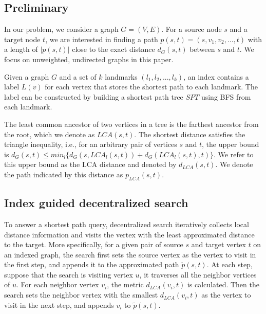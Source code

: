 \subsection{Preliminary}
In our problem, we consider a graph $G = (V,E)$. For a source node $s$ and a target node $t$, we are interested in finding a path $p(s,t)=(s,v_1,v_2,...,t)$ with a length of $|p(s,t)|$ close to the exact distance $d_G(s,t)$ between $s$ and $t$. We focus on unweighted, undirected graphs in this paper.

Given a graph $G$ and a set of $k$ landmarks $(l_1,l_2,...,l_k)$, an index contains a label $L(v)$ for each vertex that stores the shortest path to each landmark. The label can be constructed by building a shortest path tree $SPT$ using BFS from each landmark.

The least common ancestor of two vertices in a tree is the farthest ancestor from the root, which we denote as $LCA(s,t)$. The shortest distance satisfies the triangle inequality, i.e., for an arbitrary pair of vertices $s$ and $t$, the upper bound is $d_G(s,t) \leq min_{l}\{d_G(s,LCA_{l}(s,t)) + d_G(LCA_{l}(s,t),t)\}$.
We refer to this upper bound as the LCA distance and denoted by $d_{LCA}(s,t)$. We denote the path indicated by this distance as $p_{LCA}(s,t)$. 

\subsection{Index guided decentralized search}

To answer a shortest path query, decentralized search iteratively collects local distance information and visits the vertex with the least approximated distance to the target. More specifically, for a given pair of source $s$ and target vertex $t$ on an indexed graph, the search first sets the source vertex as the vertex to visit in the first step, and appends it to the approximated path $\tilde{p}(s,t)$. At each step, suppose that the search is visiting vertex $u$, it traverses all the neighbor vertices of $u$. For each neighbor vertex $v_i$, the metric $d_{LCA}(v_i,t)$ is calculated. Then the search sets the neighbor vertex with the smallest $d_{LCA}(v_i,t)$ as the vertex to visit in the next step, and appends $v_i$ to $\tilde{p}(s,t)$.

